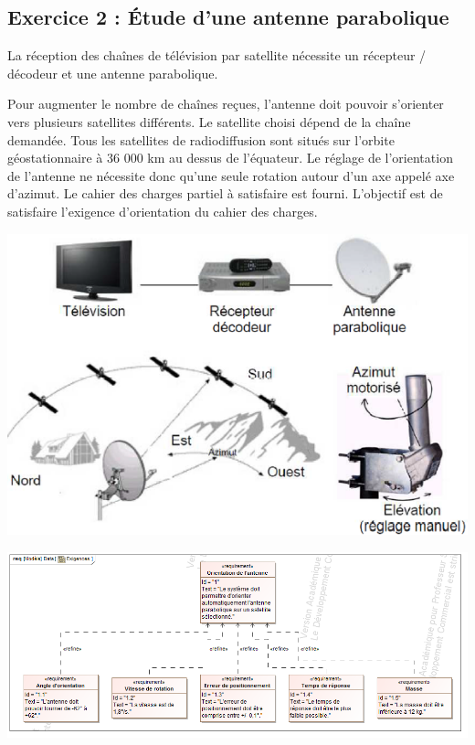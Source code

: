 \documentclass[10pt]{article}
\begin{document}
\subsection*{Exercice 2 : Étude d'une antenne parabolique}
\setcounter{subparagraph}{0}
\begin{minipage}[c]{.68\linewidth}
La réception des chaînes de télévision par satellite nécessite un récepteur / décodeur et une antenne parabolique. 

Pour augmenter le nombre de chaînes reçues, l'antenne doit pouvoir s'orienter vers plusieurs satellites différents. Le satellite choisi dépend de la chaîne demandée. Tous les satellites de radiodiffusion sont situés sur l'orbite géostationnaire à 36 000 km au dessus de l'équateur. Le réglage de l'orientation de l'antenne ne nécessite donc qu'une seule rotation autour d'un axe appelé axe d'azimut. Le cahier des charges partiel à satisfaire est fourni. L'objectif est de satisfaire l'exigence d'orientation du cahier des charges.

\end{minipage} \hfill
\begin{minipage}[c]{.3\linewidth}
\begin{center}
\includegraphics[width=\textwidth]{images/exo2_1}
\end{center}
\end{minipage}

\begin{center}
\includegraphics[width=.8\textwidth]{images/ExigencesAntenne}
\end{center}
\end{document}
